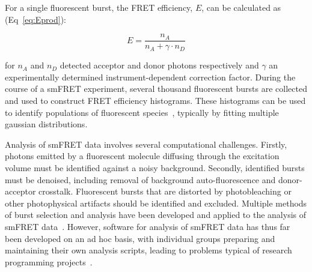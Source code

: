 For a single fluorescent burst, the FRET efficiency, $E$, can be calculated as (Eq~\ref{eq:Eprod}):

\begin{equation}
E = \frac{n_A}{n_A + \gamma \cdot n_D}
\label{eq:Eprod}
\end{equation} 

for $n_A$ and $n_D$ detected acceptor and donor photons respectively and $\gamma$ an experimentally determined instrument-dependent correction factor. During the course of a smFRET experiment, several thousand fluorescent bursts are collected and used to construct FRET efficiency histograms. These histograms can be used to identify populations of fluorescent species~\cite{ha96}, typically by fitting multiple gaussian distributions.

Analysis of smFRET data involves several computational challenges. Firstly, photons emitted by a fluorescent molecule diffusing through the excitation volume must be identified against a noisy background. Secondly, identified bursts must be denoised, including removal of background auto-fluorescence and donor-acceptor crosstalk. Fluorescent bursts that are distorted by photobleaching or other photophysical artifacts should be identified and excluded. Multiple methods of burst selection and analysis have been developed and applied to the analysis of smFRET data~\cite{weiss00, deniz01, gell06, nir06, kapanidis05, muller05, doose07, kudryavtsev2012, eggeling01}. However, software for analysis of smFRET data has thus far been developed on an ad hoc basis, with individual groups preparing and maintaining their own analysis scripts, leading to problems typical of research programming projects~\cite{wilson06, merali10}. 



